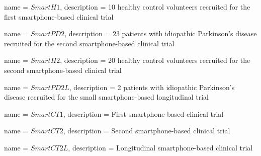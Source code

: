 {
	name = $SmartH1$, 
	description = 10 healthy control volunteers recruited for the first smartphone-based clinical trial
}

{
	name = $SmartPD2$, 
	description = 23 patients with idiopathic Parkinson's disease recruited for the second smartphone-based clinical trial
}

{
	name = $SmartH2$, 
	description = 20 healthy control volunteers recruited for the second smartphone-based clinical trial
}

{
	name = $SmartPD2L$, 
	description = 2 patients with idiopathic Parkinson's disease recruited for the small smartphone-based longitudinal trial
}

{
	name = $SmartCT1$, 
	description = First smartphone-based clinical trial
}

{
	name = $SmartCT2$, 
	description = Second smartphone-based clinical trial
}

{
	name = $SmartCT2L$, 
	description = Longitudinal smartphone-based clinical trial
}


\makenoidxglossaries